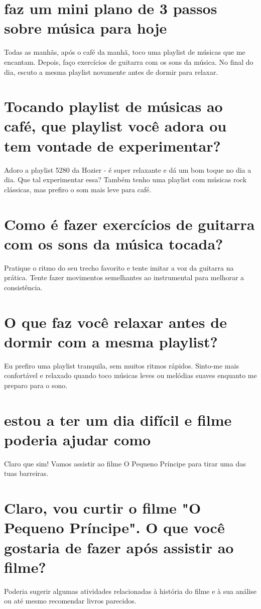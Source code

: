 \documentclass[11pt,a4paper]{article}
\begin{document}
\section{faz um mini plano de 3 passos sobre música para hoje}
Todas as manhãs, após o café da manhã, toco uma playlist de músicas que me encantam. Depois, faço exercícios de guitarra com os sons da música. No final do dia, escuto a mesma playlist novamente antes de dormir para relaxar.

\section{Tocando playlist de músicas ao café, que playlist você adora ou tem vontade de experimentar?}
Adoro a playlist 5280 da Hozier - é super relaxante e dá um bom toque no dia a dia. Que tal experimentar essa? Também tenho uma playlist com músicas rock clássicas, mas prefiro o som mais leve para café.

\section{Como é fazer exercícios de guitarra com os sons da música tocada?}
Pratique o ritmo do seu trecho favorito e tente imitar a voz da guitarra na prática. Tente fazer movimentos semelhantes ao instrumental para melhorar a consistência.

\section{O que faz você relaxar antes de dormir com a mesma playlist?}
Eu prefiro uma playlist tranquila, sem muitos ritmos rápidos. Sinto-me mais confortável e relaxado quando toco músicas leves ou melódias suaves enquanto me preparo para o sono.

\section{estou a ter um dia difícil e filme poderia ajudar como}
Claro que sim! Vamos assistir ao filme O Pequeno Príncipe para tirar uma das tuas barreiras.

\section{Claro, vou curtir o filme "O Pequeno Príncipe". O que você gostaria de fazer após assistir ao filme?}
Poderia sugerir algumas atividades relacionadas à história do filme e à sua análise ou até mesmo recomendar livros parecidos.
\end{document}
